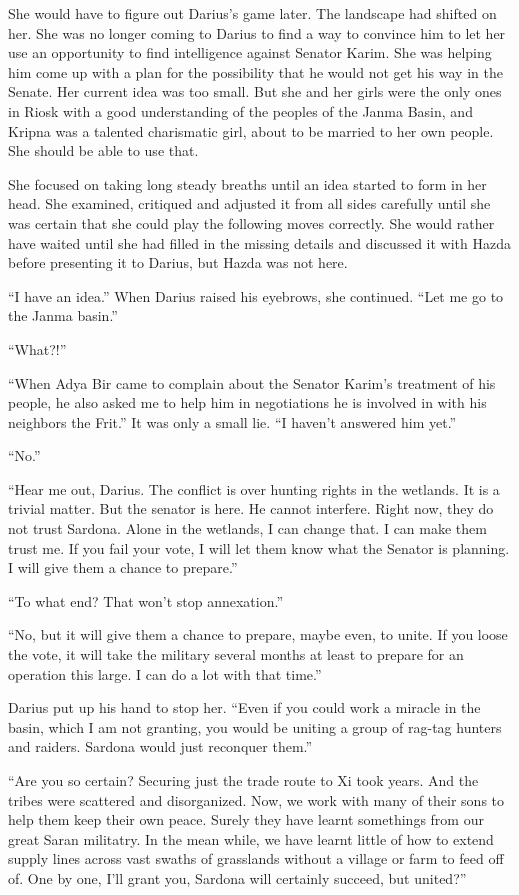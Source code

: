 \documentclass{article}
\begin{document}
	She would have to figure out Darius’s game later. The landscape had shifted on her. She was no longer coming to Darius to find a way to convince him to let her use an opportunity to find intelligence against Senator Karim. She was helping him come up with a plan for the possibility that he would not get his way in the Senate. Her current idea was too small. But she and her girls were the only ones in Riosk with a good understanding of the peoples of the Janma Basin, and Kripna was a talented charismatic girl, about to be married to her own people. She should be able to use that.
	
	She focused on taking long steady breaths until an idea started to form in her head. She examined, critiqued and adjusted it from all sides carefully until she was certain that she could play the following moves correctly. She would rather have waited until she had filled in the missing details and discussed it with Hazda before presenting it to Darius, but Hazda was not here.
	
	“I have an idea.” When Darius raised his eyebrows, she continued. “Let me go to the Janma basin.”
	
	
	“What?!” 
	
	“When Adya Bir came to complain about the Senator Karim’s treatment of his people, he also asked me to help him in negotiations he is involved in with his neighbors the Frit.” It was only a small lie. “I haven’t answered him yet.”
	
	“No.”
	
	
	“Hear me out, Darius. The conflict is over hunting rights in the wetlands. It is a trivial matter. But the senator is here. He cannot interfere. Right now, they do not trust Sardona. Alone in the wetlands, I can change that. I can make them trust me. If you fail your vote, I will let them know what the Senator is planning. I will give them a chance to prepare.” 
	
	“To what end? That won’t stop annexation.”
	
	“No, but it will give them a chance to prepare, maybe even, to unite. If you loose the vote, it will take the military several months at least to prepare for an operation this large. I can do a lot with that time.” 
	
	Darius put up his hand to stop her. “Even if you could work a miracle in the basin, which I am not granting, you would be uniting a group of rag-tag hunters and raiders. Sardona would just reconquer them.”
	
	“Are you so certain? Securing just the trade route to Xi took years. And the tribes were scattered and disorganized. Now, we work with many of their sons to help them keep their own peace. Surely they have learnt somethings from our great Saran militatry. In the mean while, we have learnt little of how to extend supply lines across vast swaths of grasslands without a village or farm to feed off of. One by one, I’ll grant you, Sardona will certainly succeed, but united?”
	
\end{document}
